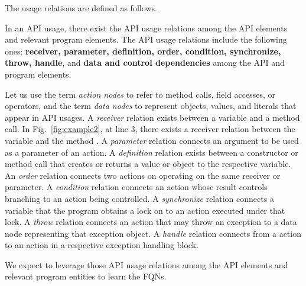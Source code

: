 The usage relations are defined as follows.

\begin{Definition}
  In an API usage, there exist the API usage relations among the API
  elements and relevant program elements. The API usage relations
  include the following ones: {\bf receiver, parameter, definition,
    order, condition, synchronize, throw, handle}, and {\bf data and
    control dependencies} among the API and program elements.
\end{Definition}

Let us use the term {\em action nodes} to refer to method calls, field
accesses, or operators, and the term {\em data nodes} to represent
objects, values, and literals that appear in API usages. A {\em
  receiver} relation exists between a variable and a method call. In
Fig.~\ref{fig:example2}, at line 3, there exists a receiver relation
between the variable  and the method
. A {\em parameter} relation connects an
argument to be used as a parameter of an action. A {\em definition}
relation exists between a constructor or method call that creates or
returns a value or object to the respective variable. An {\em order}
relation connects two actions on operating on the same receiver or
parameter. A {\em condition} relation connects an action whose result
controls branching to an action being controlled. A {\em synchronize}
relation connects a variable that the program obtains a lock on to an
action executed under that lock. A {\em throw} relation connects an
action that may throw an exception to a data node representing that
exception object. A {\em handle} relation connects from a 
action to an action in a respective exception handling block.

We expect to leverage those API usage relations among the API elements
and relevant program entities to learn the FQNs.



